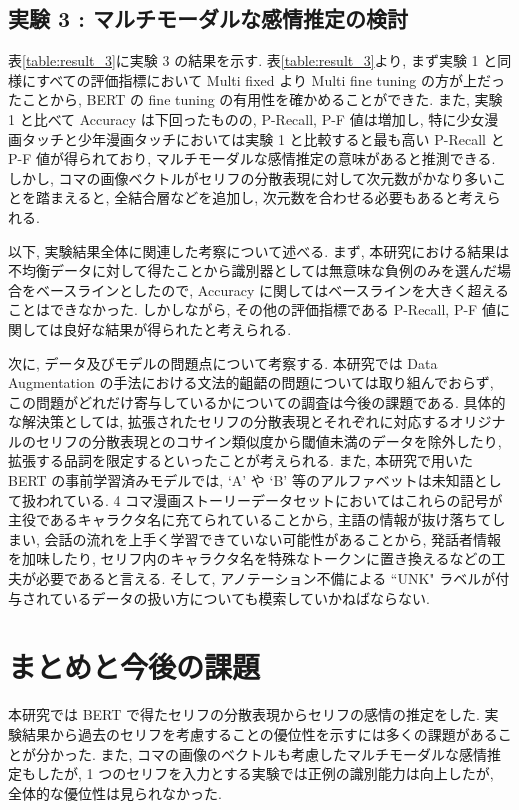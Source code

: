 \documentclass[twocolumn]{jarticle}     %
\begin{document}
\subsection{\small{実験 3 : マルチモーダルな感情推定の検討}}
表\ref{table:result_3}に実験 3 の結果を示す.
表\ref{table:result_3}より, まず実験 1 と同様にすべての評価指標において Multi fixed より Multi fine tuning の方が上だったことから, BERT の fine tuning の有用性を確かめることができた. また, 実験 1 と比べて Accuracy は下回ったものの, P-Recall, P-F 値は増加し, 特に少女漫画タッチと少年漫画タッチにおいては実験 1 と比較すると最も高い P-Recall と P-F 値が得られており, マルチモーダルな感情推定の意味があると推測できる. しかし, コマの画像ベクトルがセリフの分散表現に対して次元数がかなり多いことを踏まえると, 全結合層などを追加し, 次元数を合わせる必要もあると考えられる.

以下, 実験結果全体に関連した考察について述べる.
まず, 本研究における結果は不均衡データに対して得たことから識別器としては無意味な負例のみを選んだ場合をベースラインとしたので, Accuracy に関してはベースラインを大きく超えることはできなかった. しかしながら, その他の評価指標である P-Recall, P-F 値に関しては良好な結果が得られたと考えられる.

次に, データ及びモデルの問題点について考察する. 本研究では Data Augmentation の手法における文法的齟齬の問題については取り組んでおらず, この問題がどれだけ寄与しているかについての調査は今後の課題である. 具体的な解決策としては, 拡張されたセリフの分散表現とそれぞれに対応するオリジナルのセリフの分散表現とのコサイン類似度から閾値未満のデータを除外したり, 拡張する品詞を限定するといったことが考えられる. また, 本研究で用いた BERT の事前学習済みモデルでは, `A' や `B' 等のアルファベットは未知語として扱われている. 4 コマ漫画ストーリーデータセットにおいてはこれらの記号が主役であるキャラクタ名に充てられていることから, 主語の情報が抜け落ちてしまい, 会話の流れを上手く学習できていない可能性があることから, 発話者情報を加味したり, セリフ内のキャラクタ名を特殊なトークンに置き換えるなどの工夫が必要であると言える. そして, アノテーション不備による ``UNK" ラベルが付与されているデータの扱い方についても模索していかねばならない.


\section{まとめと今後の課題}
本研究では BERT で得たセリフの分散表現からセリフの感情の推定をした. 実験結果から過去のセリフを考慮することの優位性を示すには多くの課題があることが分かった. また, コマの画像のベクトルも考慮したマルチモーダルな感情推定もしたが, 1 つのセリフを入力とする実験では正例の識別能力は向上したが, 全体的な優位性は見られなかった.
\end{document}
